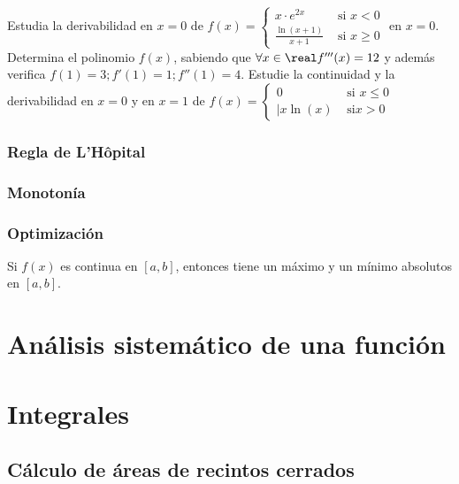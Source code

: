 \begin{problem}

\ppart[17.2-MadA] Estudia la derivabilidad en $x=0$ de $f(x) = \begin{cases}\displaystyle x·e^{2x} &\mbox{ si } x<0\\ \displaystyle\frac{\ln(x+1)}{x+1}&\mbox{ si } x\geq 0\end{cases}$ en $x=0$. 
\ppart[16.1-MadB] Determina el polinomio $f(x)$, sabiendo que $\forall x\in\real f'''(x) = 12$ y además verifica $f(1) = 3; f'(1) = 1; f''(1) = 4$.
\ppart[16.1-MadB] Estudie la continuidad y la derivabilidad en $x=0$ y en $x=1$ de $f(x) = \begin{cases} 0& \text{ si } x\leq 0\\|x\ln(x)&\text{ si} x>0\end{cases}$
\solution
\end{problem}

\subsubsection{Regla de L'Hôpital}

\subsubsection{Monotonía}

\begin{theorem}
\end{theorem}
\begin{theorem}
\end{theorem}

\subsubsection{Optimización}


\begin{theorem}
Si $f(x)$ es continua en $[a,b]$, entonces tiene un máximo y un mínimo absolutos en $[a,b]$.
\end{theorem}


\section{Análisis sistemático de una función}

\section{Integrales}

\subsection{Cálculo de áreas de recintos cerrados}